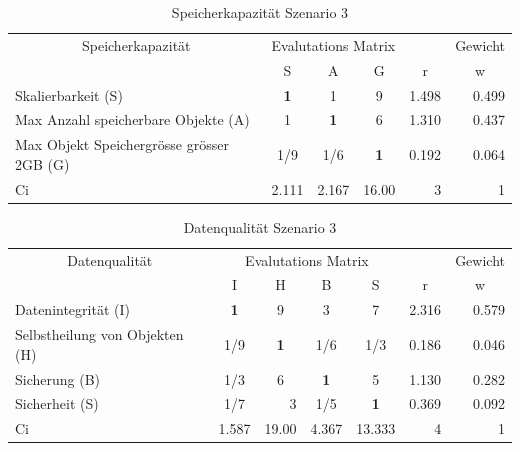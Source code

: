 \begin{table}[htbp]
\caption{Speicherkapazität Szenario 3}
\begin{tabular}{|p{7.1cm}|c|c|c|r|r|}
\hline
\multicolumn{ 1}{|c|}{Speicherkapazität } & \multicolumn{ 3}{c|}{Evalutations Matrix} & \multicolumn{1}{l|}{} & \multicolumn{1}{l|}{Gewicht} \\ \cline{ 2- 6}
\multicolumn{ 1}{|c|}{} & S & A & G & \multicolumn{1}{c|}{r} & \multicolumn{1}{c|}{w} \\ \hline
Skalierbarkeit (S) & \textbf{1} & 1 & 9 & 1.498 & 0.499 \\ \hline
Max Anzahl speicherbare Objekte (A) & 1 & \textbf{1} & 6 & 1.310 & 0.437 \\ \hline
Max Objekt Speichergrösse grösser 2GB (G) &  1/9 &  1/6 & \textbf{1} & 0.192 & 0.064 \\ \hline \hline
Ci & \multicolumn{1}{r|}{2.111} & \multicolumn{1}{r|}{2.167} & \multicolumn{1}{r|}{16.00} & 3 & 1 \\ \hline
\end{tabular}
\label{AHPSpeicherkapazitätS3}
\end{table}


\begin{table}[htbp]
\caption{Datenqualität Szenario 3}
\begin{tabular}{|l|c|c|c|c|r|r|}
\hline
\multicolumn{ 1}{|c|}{Datenqualität} & \multicolumn{ 4}{c|}{Evalutations Matrix} & \multicolumn{1}{l|}{} & \multicolumn{1}{l|}{Gewicht} \\ \cline{ 2- 7}
\multicolumn{ 1}{|c|}{} & I & H & B & S & \multicolumn{1}{c|}{r} & \multicolumn{1}{c|}{w} \\ \hline
Datenintegrität (I) & \textbf{1} & 9 & 3 & 7 & 2.316 & 0.579 \\ \hline
Selbstheilung von Objekten (H) &  1/9 & \textbf{1} &  1/6 &  1/3 & 0.186 & 0.046 \\ \hline
Sicherung (B) &  1/3 & 6 & \textbf{1} & 5 & 1.130 & 0.282 \\ \hline
Sicherheit (S) &  1/7 & \multicolumn{1}{r|}{3    } &  1/5 & \textbf{1} & 0.369 & 0.092 \\ \hline  \hline
Ci & \multicolumn{1}{r|}{1.587} & \multicolumn{1}{r|}{19.00} & \multicolumn{1}{r|}{4.367} & \multicolumn{1}{r|}{13.333} & 4 & 1 \\ \hline
\end{tabular}
\label{AHPDatenqualitätS3}
\end{table}

